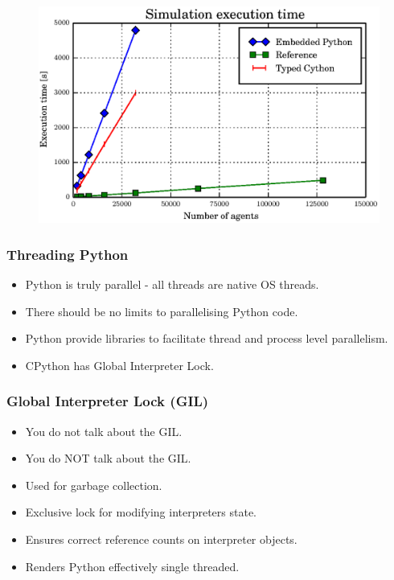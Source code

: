 \documentclass[t]{beamer}
\begin{document}
\begin{frame}[c]
	\begin{figure}[H]
	    \includegraphics[width=\columnwidth]{graphs/cython-typed-perf.eps}
	\end{figure}
\end{frame}


\begin{frame}
	\frametitle{\huge Threading Python}
	\Large
	\begin{itemize}
		\item Python is truly parallel - all threads are native OS threads.
		\item There should be no limits to parallelising Python code.
		\item Python provide libraries to facilitate thread and process level parallelism.
		\item CPython has Global Interpreter Lock.
	\end{itemize}
\end{frame}


\begin{frame}
	\frametitle{\huge Global Interpreter Lock (GIL)}
	\Large
	\begin{itemize}
		\item You do not talk about the GIL.
		\item You do NOT talk about the GIL.
	\end{itemize}
	\pause
	\begin{itemize}
		\item Used for garbage collection.
		\item Exclusive lock for modifying interpreters state.
		\item Ensures correct reference counts on interpreter objects.
		\item Renders Python effectively single threaded.
	\end{itemize}
\end{frame}
\end{document}
